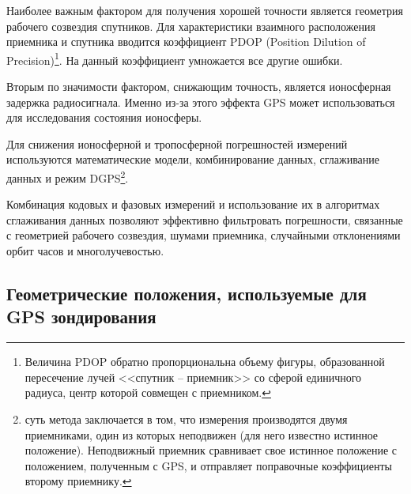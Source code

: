 \documentclass[14pt,eqno, fontsize=14pt]{article}
\begin{document}
Наиболее важным фактором для получения хорошей точности является геометрия рабочего созвездия спутников. Для характеристики взаимного расположения приемника и спутника вводится коэффициент PDOP (Position Dilution of Precision)\footnote{Величина PDOP обратно пропорциональна объему фигуры, образованной пересечение лучей <<спутник -- приемник>> со сферой единичного радиуса, центр которой совмещен с приемником.}. На данный коэффициент умножается все другие ошибки. 

Вторым по значимости фактором, снижающим точность, является ионосферная задержка радиосигнала. Именно из-за этого эффекта GPS может использоваться для исследования состояния ионосферы.

Для снижения ионосферной и тропосферной погрешностей измерений используются математические модели, комбинирование данных, сглаживание данных и режим DGPS\footnote{суть метода заключается в том, что измерения производятся двумя приемниками, один из которых неподвижен (для него известно истинное положение). Неподвижный приемник сравнивает свое истинное положение с положением, полученным с GPS, и отправляет поправочные коэффициенты второму приемнику.}.

Комбинация кодовых и фазовых измерений и использование их в алгоритмах сглаживания данных позволяют эффективно фильтровать погрешности, связанные с геометрией рабочего созвездия, шумами приемника, случайными отклонениями орбит часов и многолучевостью. 

\subsection{Геометрические положения, используемые для GPS зондирования}

 

 
\end{document}
